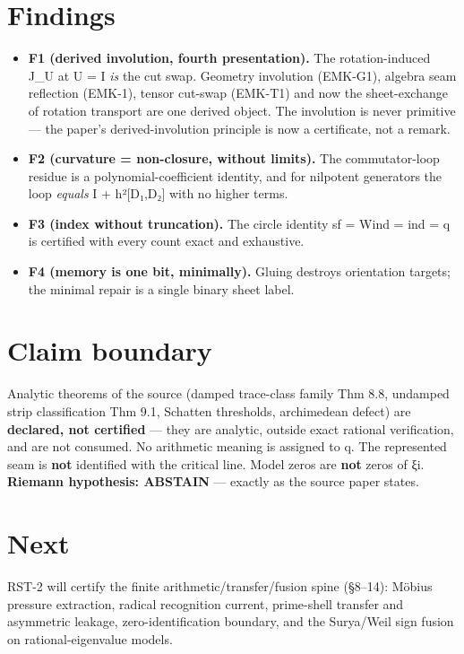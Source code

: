 \hypertarget{findings}{%
\section{Findings}\label{findings}}

\begin{itemize}
\tightlist
\item
  \textbf{F1 (derived involution, fourth presentation).} The rotation-induced
  J\_U at U = I \emph{is} the cut swap. Geometry involution (EMK-G1), algebra
  seam reflection (EMK-1), tensor cut-swap (EMK-T1) and now the
  sheet-exchange of rotation transport are one derived object. The
  involution is never primitive --- the paper's derived-involution
  principle is now a certificate, not a remark.
\item
  \textbf{F2 (curvature = non-closure, without limits).} The commutator-loop
  residue is a polynomial-coefficient identity, and for nilpotent
  generators the loop \emph{equals} I + h²{[}D₁,D₂{]} with no higher terms.
\item
  \textbf{F3 (index without truncation).} The circle identity
  sf = Wind = ind = q is certified with every count exact and exhaustive.
\item
  \textbf{F4 (memory is one bit, minimally).} Gluing destroys orientation
  targets; the minimal repair is a single binary sheet label.
\end{itemize}

\hypertarget{claim-boundary}{%
\section{Claim boundary}\label{claim-boundary}}

Analytic theorems of the source (damped trace-class family Thm 8.8,
undamped strip classification Thm 9.1, Schatten thresholds, archimedean
defect) are \textbf{declared, not certified} --- they are analytic, outside
exact rational verification, and are not consumed. No arithmetic meaning
is assigned to q. The represented seam is \textbf{not} identified with the
critical line. Model zeros are \textbf{not} zeros of ξi. \textbf{Riemann
hypothesis: ABSTAIN} --- exactly as the source paper states.

\hypertarget{next}{%
\section{Next}\label{next}}

RST-2 will certify the finite arithmetic/transfer/fusion spine
(§8--14): Möbius pressure extraction, radical recognition current,
prime-shell transfer and asymmetric leakage, zero-identification
boundary, and the Surya/Weil sign fusion on rational-eigenvalue models.

